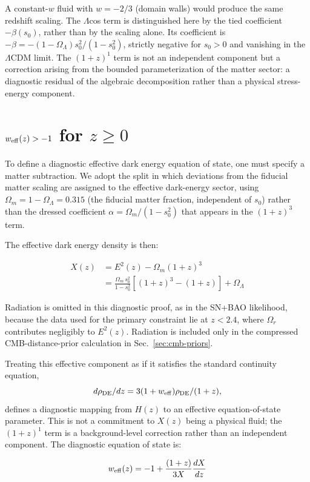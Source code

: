 \documentclass[
  aps,
  prd,
  onecolumn,         %
  nofootinbib,
  longbibliography
]{revtex4-2}
\begin{document}
A constant-$w$ fluid with $w = -2/3$ (domain walls) would produce the same
redshift scaling. The $\Lambda$cos term is distinguished here by the tied
coefficient $-\beta(s_0)$, rather than by the scaling alone. Its coefficient is
$-\beta = -(1-\Omega_\Lambda)s_0^2/(1-s_0^2)$, strictly negative for $s_0 > 0$ and
vanishing in the $\Lambda$CDM limit. The $(1+z)^1$ term is not an independent component but
a correction arising from the bounded parameterization of the matter
sector: a diagnostic residual of the algebraic decomposition rather than
a physical stress-energy component.

\section{$w_{\rm eff}(z) > -1$ for $z \geq 0$}\label{sec:weff-proof}

To define a diagnostic effective dark energy equation of state, one must
specify a matter subtraction. We adopt the split in which deviations
from the fiducial matter scaling are assigned to the effective
dark-energy sector, using $\Omega_m = 1 - \Omega_\Lambda = 0.315$ (the fiducial matter
fraction, independent of $s_0$) rather than the dressed coefficient
$\alpha = \Omega_m/(1-s_0^2)$ that appears in the $(1+z)^3$ term.

The effective dark energy density is then:

\[\begin{aligned}
X(z) &= E^2(z) - \Omega_m(1+z)^3 \\
     &= \frac{\Omega_m\, s_0^2}{1 - s_0^2}\left[(1+z)^3 - (1+z)\right] + \Omega_\Lambda
\end{aligned}\]

Radiation is omitted in this diagnostic proof, as in the SN+BAO likelihood,
because the data used for the primary constraint lie at $z < 2.4$, where
$\Omega_r$ contributes negligibly to $E^2(z)$. Radiation is included only
in the compressed CMB-distance-prior calculation in Sec.~\ref{sec:cmb-priors}.

Treating this effective component as if it satisfies the standard
continuity equation,
\[d\rho_{\rm DE}/dz = 3(1+w_{\rm eff})\rho_{\rm DE}/(1+z),\]
defines a diagnostic mapping from $H(z)$ to an effective
equation-of-state parameter. This is not a commitment to $X(z)$ being a
physical fluid; the $(1+z)^1$ term is a background-level correction
rather than an independent component. The
diagnostic equation of state is:

\[w_{\rm eff}(z) = -1 + \frac{(1+z)}{3X}\frac{dX}{dz}\]
\end{document}

